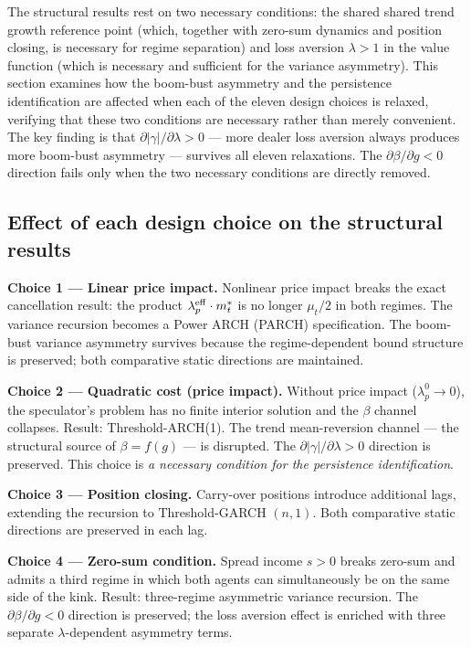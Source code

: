 \documentclass[12pt,a4paper]{article}
\theoremstyle{definition}
\begin{document}
The structural results rest on two necessary conditions: the shared
shared trend growth reference point (which, together with zero-sum dynamics and
position closing, is necessary for regime separation) and loss aversion
$\lambda > 1$ in the value function (which is necessary and sufficient
for the variance asymmetry). This section examines how the boom-bust
asymmetry and the persistence identification are affected when each of
the eleven design choices is relaxed, verifying that these two conditions
are necessary rather than merely convenient. The key finding is that
$\partial|\gamma|/\partial\lambda > 0$ --- more dealer loss aversion
always produces more boom-bust asymmetry --- survives all eleven
relaxations. The $\partial\beta/\partial g < 0$ direction fails only
when the two necessary conditions are directly removed.

\subsection*{Effect of each design choice on the structural results}

\noindent\textbf{Choice 1 --- Linear price impact.} Nonlinear price
impact breaks the exact cancellation result: the product
$\lambda^{\rm eff}_p \cdot m^*_t$ is no longer $\mu_t/2$ in both regimes.
The variance recursion becomes a Power ARCH (PARCH) specification.
The boom-bust variance asymmetry survives because the regime-dependent
bound structure is preserved; both comparative static directions are
maintained.

\noindent\textbf{Choice 2 --- Quadratic cost (price impact).} Without
price impact ($\lambda^0_p \to 0$), the speculator's problem has no
finite interior solution and the $\beta$ channel collapses. Result:
Threshold-ARCH(1). The trend mean-reversion channel --- the
structural source of $\beta = f(g)$ --- is disrupted. The
$\partial|\gamma|/\partial\lambda > 0$ direction is preserved. This
choice is \emph{a necessary condition for the persistence identification}.

\noindent\textbf{Choice 3 --- Position closing.} Carry-over positions
introduce additional lags, extending the recursion to Threshold-GARCH
$(n,1)$. Both comparative static directions are preserved in each lag.

\noindent\textbf{Choice 4 --- Zero-sum condition.} Spread income $s > 0$
breaks zero-sum and admits a third regime in which both agents can
simultaneously be on the same side of the kink. Result: three-regime
asymmetric variance recursion. The $\partial\beta/\partial g < 0$
direction is preserved; the loss aversion effect is enriched with three
separate $\lambda$-dependent asymmetry terms.
\end{document}
